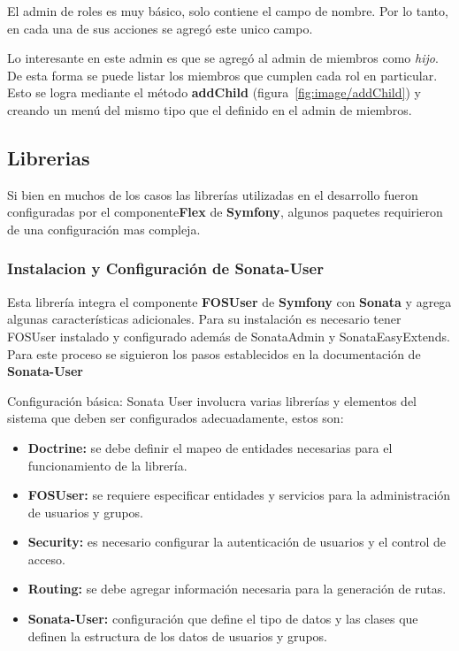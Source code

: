 \documentclass{article}
\begin{document}
El admin de roles es muy básico, solo contiene el campo de nombre. Por lo tanto, en cada una de sus acciones se agregó este unico campo.


Lo interesante en este admin es que se agregó al admin de miembros como \textit{hijo}. De esta forma se puede listar los miembros que cumplen cada rol en
particular.
Esto se logra mediante el método \textbf{addChild} (figura~\ref{fig:image/addChild}) y creando un menú del mismo tipo que el definido en el admin de miembros.

\newpage
\subsection{Librerias}%
\label{sub:librerias}

Si bien en muchos de los casos las librerías utilizadas en el desarrollo fueron configuradas por el componente\textbf{Flex}  de \textbf{Symfony}, algunos paquetes
requirieron de una configuración mas compleja.

\subsubsection{Instalacion y Configuración de \textbf{Sonata-User}}%
\label{ssub:instalacion_y_configuración_de_sonata-user}

Esta librería integra el componente \textbf{FOSUser} de \textbf{Symfony} con \textbf{Sonata} y agrega algunas características adicionales.
Para su instalación es necesario tener FOSUser instalado y configurado además de SonataAdmin y SonataEasyExtends\@.
Para este proceso se siguieron los pasos establecidos en la documentación de \textbf{Sonata-User}~\textcite{sonata-user}

Configuración básica: Sonata User involucra varias librerías y elementos del sistema que deben ser configurados adecuadamente, estos son:

\begin{itemize}
    \item \textbf{Doctrine:} se debe definir el mapeo de entidades necesarias para el funcionamiento de la librería.
    \item \textbf{FOSUser:} se requiere especificar entidades y servicios para la administración de usuarios y grupos.
    \item \textbf{Security:} es necesario configurar la autenticación de usuarios y el control de acceso.
    \item \textbf{Routing:} se debe agregar información necesaria para la generación de rutas.
    \item \textbf{Sonata-User:} configuración que define el tipo de datos y las clases que definen la estructura de los datos de usuarios y grupos.
\end{itemize}
\end{document}
